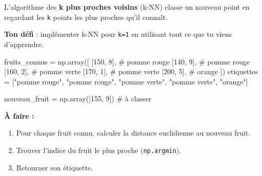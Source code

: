 \documentclass[
  french,
  11pt,
  a4paper,
]{scrbook}
\newenvironment{Shaded}{}{}
\newcommand{\CommentTok}[1]{\textcolor[rgb]{0.42,0.45,0.49}{#1}}
\newcommand{\DecValTok}[1]{\textcolor[rgb]{0.00,0.36,0.77}{#1}}
\newcommand{\NormalTok}[1]{\textcolor[rgb]{0.14,0.16,0.18}{#1}}
\newcommand{\OperatorTok}[1]{\textcolor[rgb]{0.14,0.16,0.18}{#1}}
\newcommand{\StringTok}[1]{\textcolor[rgb]{0.01,0.18,0.38}{#1}}
\providecommand{\tightlist}{%
  \setlength{\itemsep}{0pt}\setlength{\parskip}{0pt}}
\begin{document}
\begin{tcolorbox}[enhanced jigsaw, arc=.35mm, bottomrule=.15mm, bottomtitle=1mm, breakable, colback=white, colbacktitle=quarto-callout-note-color!10!white, colframe=quarto-callout-note-color-frame, coltitle=black, left=2mm, leftrule=.75mm, opacityback=0, opacitybacktitle=0.6, rightrule=.15mm, title={📝 Énoncé}, titlerule=0mm, toprule=.15mm, toptitle=1mm]

L'algorithme des \textbf{k plus proches voisins} (k-NN) classe un
nouveau point en regardant les \texttt{k} points les plus proches qu'il
connaît.

\textbf{Ton défi} : implémenter k-NN pour \texttt{k=1} en utilisant tout
ce que tu viens d'apprendre.

\begin{Shaded}
\begin{Highlighting}[]
\NormalTok{fruits\_connus }\OperatorTok{=}\NormalTok{ np.array([}
\NormalTok{    [}\DecValTok{150}\NormalTok{, }\DecValTok{8}\NormalTok{],   }\CommentTok{\# pomme rouge}
\NormalTok{    [}\DecValTok{140}\NormalTok{, }\DecValTok{9}\NormalTok{],   }\CommentTok{\# pomme rouge}
\NormalTok{    [}\DecValTok{160}\NormalTok{, }\DecValTok{2}\NormalTok{],   }\CommentTok{\# pomme verte}
\NormalTok{    [}\DecValTok{170}\NormalTok{, }\DecValTok{1}\NormalTok{],   }\CommentTok{\# pomme verte}
\NormalTok{    [}\DecValTok{200}\NormalTok{, }\DecValTok{5}\NormalTok{],   }\CommentTok{\# orange}
\NormalTok{])}
\NormalTok{etiquettes }\OperatorTok{=}\NormalTok{ [}\StringTok{"pomme rouge"}\NormalTok{, }\StringTok{"pomme rouge"}\NormalTok{, }\StringTok{"pomme verte"}\NormalTok{, }
              \StringTok{"pomme verte"}\NormalTok{, }\StringTok{"orange"}\NormalTok{]}

\NormalTok{nouveau\_fruit }\OperatorTok{=}\NormalTok{ np.array([}\DecValTok{155}\NormalTok{, }\DecValTok{9}\NormalTok{])  }\CommentTok{\# à classer}
\end{Highlighting}
\end{Shaded}

\textbf{À faire :}

\begin{enumerate}
\def\labelenumi{\arabic{enumi}.}
\tightlist
\item
  Pour chaque fruit connu, calculer la distance euclidienne au nouveau
  fruit.
\item
  Trouver l'indice du fruit le plus proche (\texttt{np.argmin}).
\item
  Retourner son étiquette.
\end{enumerate}

\end{tcolorbox}
\end{document}
